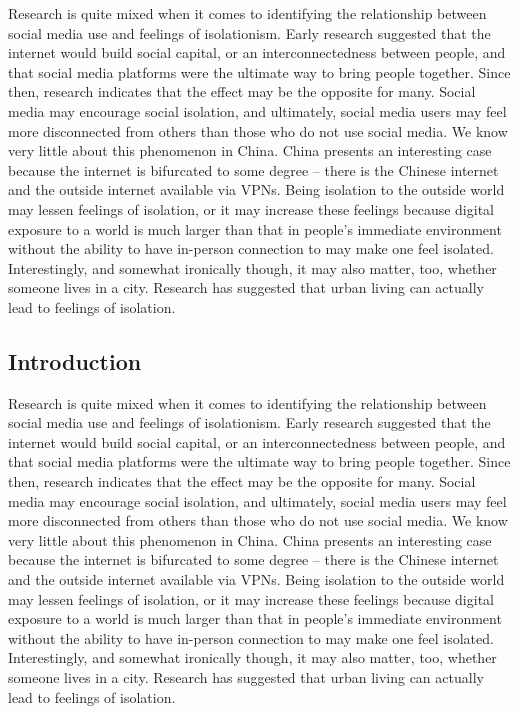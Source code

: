 \documentclass[
  letterpaper,
  DIV=11,
  numbers=noendperiod]{scrartcl}
\begin{document}
Research is quite mixed when it comes to identifying the relationship
between social media use and feelings of isolationism. Early research
suggested that the internet would build social capital, or an
interconnectedness between people, and that social media platforms were
the ultimate way to bring people together. Since then, research
indicates that the effect may be the opposite for many. Social media may
encourage social isolation, and ultimately, social media users may feel
more disconnected from others than those who do not use social media. We
know very little about this phenomenon in China. China presents an
interesting case because the internet is bifurcated to some degree --
there is the Chinese internet and the outside internet available via
VPNs. Being isolation to the outside world may lessen feelings of
isolation, or it may increase these feelings because digital exposure to
a world is much larger than that in people's immediate environment
without the ability to have in-person connection to may make one feel
isolated. Interestingly, and somewhat ironically though, it may also
matter, too, whether someone lives in a city. Research has suggested
that urban living can actually lead to feelings of isolation.

\hypertarget{introduction-1}{%
\subsection{Introduction}\label{introduction-1}}

Research is quite mixed when it comes to identifying the relationship
between social media use and feelings of isolationism. Early research
suggested that the internet would build social capital, or an
interconnectedness between people, and that social media platforms were
the ultimate way to bring people together. Since then, research
indicates that the effect may be the opposite for many. Social media may
encourage social isolation, and ultimately, social media users may feel
more disconnected from others than those who do not use social media. We
know very little about this phenomenon in China. China presents an
interesting case because the internet is bifurcated to some degree --
there is the Chinese internet and the outside internet available via
VPNs. Being isolation to the outside world may lessen feelings of
isolation, or it may increase these feelings because digital exposure to
a world is much larger than that in people's immediate environment
without the ability to have in-person connection to may make one feel
isolated. Interestingly, and somewhat ironically though, it may also
matter, too, whether someone lives in a city. Research has suggested
that urban living can actually lead to feelings of isolation.
\end{document}
